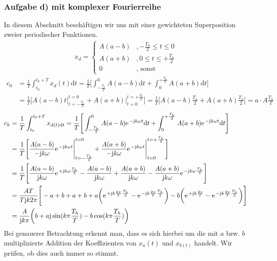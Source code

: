 \documentclass[11pt,a4paper,DIV=12]{scrartcl}
\newcommand{\diff}{\mathrm{d}}
\begin{document}
\subsubsection*{Aufgabe d) mit komplexer Fourierreihe}
In diesem Abschnitt beschäftigen wir uns mit einer gewichteten Superposition zweier periodischer Funktionen.
\begin{align}
	x_d=\begin{cases}
		A(a-b)&,-\frac{T_h}{2}\leq t \leq 0 \\
		A(a+b)&,0\leq t \leq +\frac{T_h}{2}\\
		0&,\text{ sonst}
	\end{cases}
\end{align}
\begin{align}
	c_0&=\frac{1}{T}\int_{t_0}^{t_0+T}x_d(t)\diff t=\frac{1}{T}\Bigg [\int_{-\frac{T_h}{2}}^0A(a-b)\diff t+\int_0^{+\frac{T_h}{2}}A(a+b)\diff t\Bigg ]\nonumber \\
	&=\frac{1}{T}\Bigg [A(a-b)t\Bigg |_{t=-\frac{T_h}{2}}^{t=0}+A(a+b)\Bigg |_{t=0}^{t=+\frac{T_h}{2}}\Bigg ]=\frac{1}{T}\Bigg[A(a-b)\frac{T_h}{2}+A(a+b)\frac{T_h}{2}\Bigg ]=a\cdot A\frac{T_h}{T}
\end{align}
\begin{align}
	c_k&=\frac{1}{T}\int_{t_0}^{t_0+T}x_{\diff (t)\diff t}=\frac{1}{T}\Bigg [\int_{-\frac{T_h}{2}}^0A(a-b)\e^{-\im k \omega t}\diff t+\int_0^{+\frac{T_h}{2}}A(a+b)\e^{-\im k \omega t}\diff t\Bigg ]\nonumber \\
	&=\frac{1}{T}\Bigg [\frac{A(a-b)}{-\im k \omega}\e^{-\im k \omega t}\Bigg |_{t=-\frac{T_h}{2}}^{t=0}+\frac{A(a+b)}{-\im k \omega}\e^{-\im k \omega t}\Bigg |_{t=0}^{t=+\frac{T_h}{2}}\Bigg ]\nonumber \\
	&=\frac{1}{T}\Bigg [\frac{A(a-b)}{\im k \omega}\e^{+\im k \omega \frac{T_h}{2}}-\frac{A(a-b)}{\im k \omega}+\frac{A(a+b)}{\im k \omega}-\frac{A(a+b)}{\im k \omega}\e^{-\im k \omega \frac{T_h}{2}}\Bigg ]\nonumber \\
	&=\frac{AT}{T\im k 2\pi}\Bigg [-a+b+a+b+a\bigg (\e^{+\im k \frac{2\pi}{T}\frac{T_h}{2}}-\e^{-\im k \frac{2\pi}{T}\frac{T_h}{2}}\bigg )-b\bigg (\e^{+\im k \frac{2\pi}{T}}-\e^{-\im k \frac{2\pi}{T}\frac{T_h}{2}}\bigg )\Bigg ]\nonumber \\
	&=\frac{A}{\im k\pi}\bigg (b+a\im\sin(k\pi\frac{T_h}{T})-b\cos(k\pi\frac{T_h}{T})\bigg )
\end{align}
Bei genauerer Betrachtung erkennt man, dass es sich hierbei um die mit $a$ bzw. $b$ multiplizierte Addition der Koeffizienten von $x_a(t)$ und $x_{b(t)}$ handelt. Wir prüfen, ob dies auch immer so stimmt.
\end{document}
